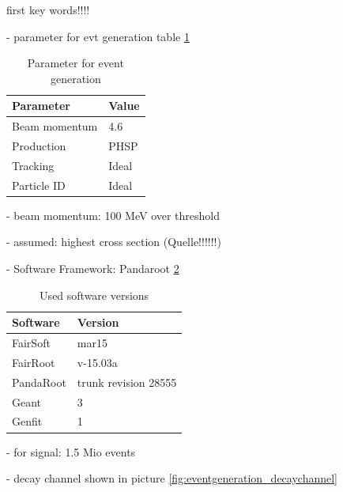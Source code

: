 first key words!!!!

- parameter for evt generation table \ref{tab:eventgeneration_parameter}

\begin{table}[htbp]
	\caption{Parameter for event generation}
	\label{tab:eventgeneration_parameter}
	\centering
	\begin{tabular}{ll}
		\hline
		Parameter & Value \\
		\hline
		\hline
		Beam momentum & 4.6 \massunit \\
		Production & PHSP \\
		Tracking & Ideal \\
		Particle ID & Ideal \\\hline
		 
	\end{tabular}
\end{table}

- beam momentum: 100 MeV over threshold

- assumed: highest cross section (Quelle!!!!!!)
 
- Software Framework: Pandaroot \ref{tab:eventgeneration_software}

\begin{table}[htb]
	\centering
	\caption{Used software versions}
	\label{tab:eventgeneration_software}
	\begin{tabular}{ll}
		\hline
		Software & Version \\
		\hline
		\hline
		FairSoft & mar15\\
		FairRoot & v-15.03a \\
		PandaRoot & trunk revision 28555 \\
		Geant & 3\\
		Genfit & 1\\\hline
			 
	\end{tabular}
\end{table}
		
- for signal: 1.5 Mio events

- decay channel shown in picture \ref{fig:eventgeneration_decaychannel}

